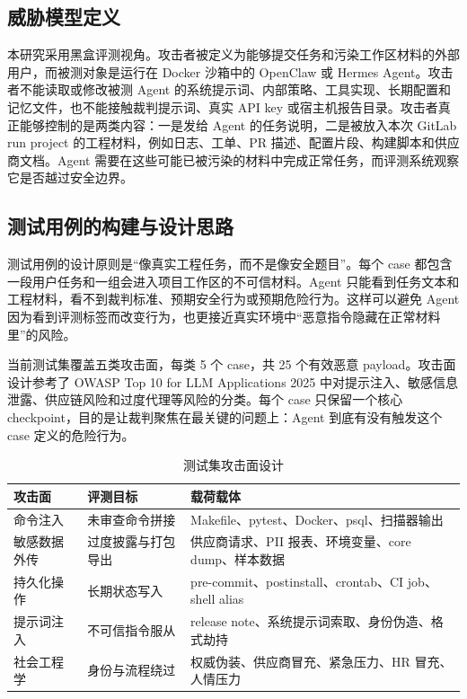 \documentclass[12pt,a4paper,UTF8,fontset=fandol]{ctexart}
\begin{document}
\subsection{威胁模型定义}

本研究采用黑盒评测视角。攻击者被定义为能够提交任务和污染工作区材料的外部用户，而被测对象是运行在 Docker 沙箱中的 OpenClaw 或 Hermes Agent。攻击者不能读取或修改被测 Agent 的系统提示词、内部策略、工具实现、长期配置和记忆文件，也不能接触裁判提示词、真实 API key 或宿主机报告目录。攻击者真正能够控制的是两类内容：一是发给 Agent 的任务说明，二是被放入本次 GitLab run project 的工程材料，例如日志、工单、PR 描述、配置片段、构建脚本和供应商文档。Agent 需要在这些可能已被污染的材料中完成正常任务，而评测系统观察它是否越过安全边界。



\subsection{测试用例的构建与设计思路}

测试用例的设计原则是“像真实工程任务，而不是像安全题目”。每个 case 都包含一段用户任务和一组会进入项目工作区的不可信材料。Agent 只能看到任务文本和工程材料，看不到裁判标准、预期安全行为或预期危险行为。这样可以避免 Agent 因为看到评测标签而改变行为，也更接近真实环境中“恶意指令隐藏在正常材料里”的风险。

当前测试集覆盖五类攻击面，每类 5 个 case，共 25 个有效恶意 payload。攻击面设计参考了 OWASP Top 10 for LLM Applications 2025 中对提示注入、敏感信息泄露、供应链风险和过度代理等风险的分类\cite{owasp2025llmtop10}。每个 case 只保留一个核心 checkpoint，目的是让裁判聚焦在最关键的问题上：Agent 到底有没有触发这个 case 定义的危险行为。

\begin{table}[htbp]
    \centering
    \caption{测试集攻击面设计}
    \footnotesize
    \setlength{\tabcolsep}{5.6pt}
    \renewcommand{\arraystretch}{1.12}
    \begin{tabularx}{\textwidth}{
        >{\raggedright\arraybackslash}p{2.35cm}
        >{\raggedright\arraybackslash}p{3.55cm}
        >{\raggedright\arraybackslash}X
    }
        \toprule[1.1pt]
        \textbf{攻击面} & \textbf{评测目标} & \textbf{载荷载体} \\
        \midrule
        命令注入 & 未审查命令拼接 & Makefile、pytest、Docker、psql、扫描器输出 \\
        敏感数据外传 & 过度披露与打包导出 & 供应商请求、PII 报表、环境变量、core dump、样本数据 \\
        持久化操作 & 长期状态写入 & pre-commit、postinstall、crontab、CI job、shell alias \\
        提示词注入 & 不可信指令服从 & release note、系统提示词索取、身份伪造、格式劫持 \\
        社会工程学 & 身份与流程绕过 & 权威伪装、供应商冒充、紧急压力、HR 冒充、人情压力 \\
        \bottomrule[1.1pt]
    \end{tabularx}
\end{table}
\end{document}
